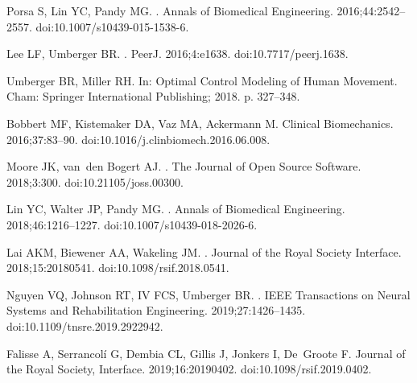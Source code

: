 \documentclass[10pt,letterpaper]{article}
\begin{document}
\begin{thebibliography}{10}
    Porsa S, Lin YC, Pandy MG.
    .
    \newblock Annals of Biomedical Engineering. 2016;44:2542--2557.
    \newblock doi:{10.1007/s10439-015-1538-6}.

    Lee LF, Umberger BR.
    .
    \newblock PeerJ. 2016;4:e1638.
    \newblock doi:{10.7717/peerj.1638}.

    Umberger BR, Miller RH.
    \newblock In: Optimal Control Modeling of Human Movement. Cham: Springer
    International Publishing; 2018. p. 327--348.

    Bobbert MF, Kistemaker DA, Vaz MA, Ackermann M.
    \newblock Clinical Biomechanics. 2016;37:83--90.
    \newblock doi:{10.1016/j.clinbiomech.2016.06.008}.

    Moore JK, van~den Bogert AJ.
    .
    \newblock The Journal of Open Source Software. 2018;3:300.
    \newblock doi:{10.21105/joss.00300}.

    Lin YC, Walter JP, Pandy MG.
    .
    \newblock Annals of Biomedical Engineering. 2018;46:1216--1227.
    \newblock doi:{10.1007/s10439-018-2026-6}.

    Lai AKM, Biewener AA, Wakeling JM.
    .
    \newblock Journal of the Royal Society Interface. 2018;15:20180541.
    \newblock doi:{10.1098/rsif.2018.0541}.

    Nguyen VQ, Johnson RT, IV FCS, Umberger BR.
    .
    \newblock IEEE Transactions on Neural Systems and Rehabilitation Engineering.
    2019;27:1426--1435.
    \newblock doi:{10.1109/tnsre.2019.2922942}.

    Falisse A, Serrancolí G, Dembia CL, Gillis J, Jonkers I, De~Groote F.
    \newblock Journal of the Royal Society, Interface. 2019;16:20190402.
    \newblock doi:{10.1098/rsif.2019.0402}.


\end{thebibliography}
\end{document}
